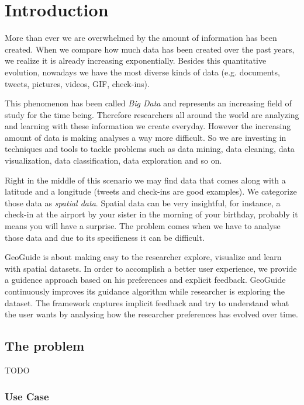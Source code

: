 \chapter{Introduction}
\label{chap:intro}

More than ever we are overwhelmed by the amount of information has been created.
When we compare how much data has been created over the past years, we realize
it is already increasing exponentially.
Besides this quantitative evolution, nowadays
we have the most diverse kinds of data
(e.g. documents, tweets, pictures, videos, GIF, check-ins).

This phenomenon has been called \textit{Big Data} and represents an increasing field of study
for the time being. Therefore researchers all around the world
are analyzing and learning with these information we create everyday.
However the increasing amount of data is making analyses a way more difficult.
So we are investing in techniques and tools to tackle problems such as data mining, data cleaning,
data visualization, data classification, data exploration and so on.

Right in the middle of this scenario we may find data that comes along with a latitude and a longitude
(tweets and check-ins are good examples). We categorize those data as \textit{spatial data}.
Spatial data can be very insightful, for instance, a check-in at the airport by your sister
in the morning of your birthday, probably it means you will have a surprise.
The problem comes when we have to analyse those data and due to its specificness it can
be difficult.

GeoGuide is about making easy to the researcher explore, visualize and learn with spatial datasets.
In order to accomplish a better user experience, we provide a guidence approach based
on his preferences and explicit feedback.
GeoGuide continuously improves its guidance algorithm while
researcher is exploring the dataset. The framework captures implicit feedback
and try to understand what the user wants by analysing how the
researcher preferences has evolved over time.


\section{The problem}

TODO

\subsection{Use Case}

